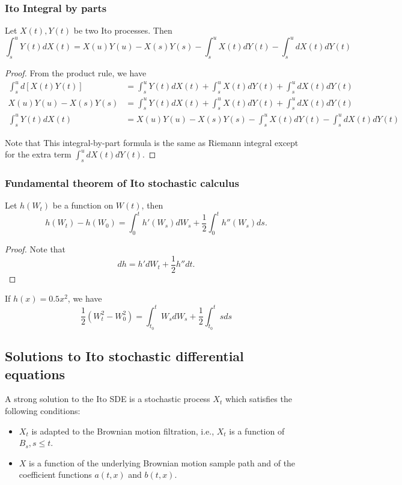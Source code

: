 \begin{refsection}
\subsubsection{Ito Integral by parts}
\begin{lemma}\cite[79]{wiersema2008brownian}
	Let $X(t),Y(t)$ be two Ito processes. Then
	$$\int_s^u Y(t)dX(t) = X(u)Y(u) - X(s)Y(s) - \int_s^u X(t)dY(t) - \int_s^u dX(t)dY(t)$$
\end{lemma}
\begin{proof}
	From the product rule, we have
	\begin{align*}
	\int_s^u d[X(t)Y(t)] &= \int_s^u Y(t)dX(t) + \int_s^u X(t)dY(t) + \int_s^u dX(t)dY(t)  \\
	X(u)Y(u) - X(s)Y(s) &=  \int_s^u Y(t)dX(t) + \int_s^u X(t)dY(t) + \int_s^u dX(t)dY(t) \\
	\int_s^u Y(t)dX(t) &= X(u)Y(u) - X(s)Y(s) - \int_s^u X(t)dY(t) - \int_s^u dX(t)dY(t) 
	\end{align*}
	
	Note that This integral-by-part formula is the same as Riemann integral except for the extra term $\int_s^u dX(t)dY(t)$.	
\end{proof}


\subsubsection{Fundamental theorem of Ito stochastic calculus}
\begin{theorem}
	\cite[79]{chang2004stochastic} 
	Let $h(W_t)$ be a function on $W(t)$, then
	$$h(W_t)-h(W_0) = \int_{0}^t h'(W_s)dW_s + \frac{1}{2}\int_{0}^t h''(W_s)ds.$$	
\end{theorem}
\begin{proof}
	Note that $$dh = h'dW_t + \frac{1}{2} h'' dt.$$
\end{proof}


\begin{example}
	If $h(x)=0.5x^2$, we have
	$$\frac{1}{2}(W_t^2 - W_0^2) = \int_{t_0}^t W_sdW_s + \frac{1}{2}\int_{t_0}^t sds$$
\end{example}

\subsection{Solutions to Ito stochastic differential equations}

\begin{definition}
	\cite[136]{mikosch1998elementary}A strong solution to the Ito SDE is a stochastic process $X_t$ which satisfies the following conditions:
	\begin{itemize}
		\item $X_t$ is adapted to the Brownian motion filtration, i.e., $X_t$ is a function of $B_s,s\leq t$.
		\item $X$ is a function of the underlying Brownian motion sample path and of the coefficient functions $a(t,x)$ and $b(t,x)$.
	\end{itemize}
\end{definition}


\end{refsection}
